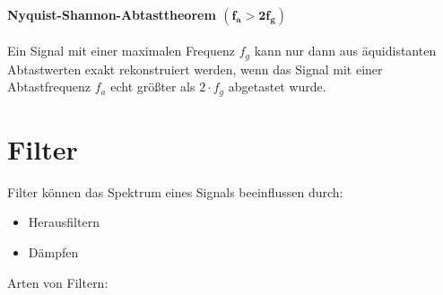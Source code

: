 \documentclass[12pt,a4paper]{article}
\newcommand{\nl}{\\[0.1cm]}
\begin{document}
\paragraph{Nyquist-Shannon-Abtasttheorem $\mathbf{(f_a>2f_g)}$}
Ein Signal mit einer maximalen Frequenz $f_g$ kann nur dann aus äquidistanten Abtastwerten exakt rekonstruiert werden, wenn das Signal mit einer Abtastfrequenz $f_a$ echt größter als $2\cdot f_g$ abgetastet wurde.


\section{Filter}
Filter können das Spektrum eines Signals beeinflussen durch:
\begin{itemize}
\item Herausfiltern
\item Dämpfen
\end{itemize}
Arten von Filtern:\nl
\end{document}
